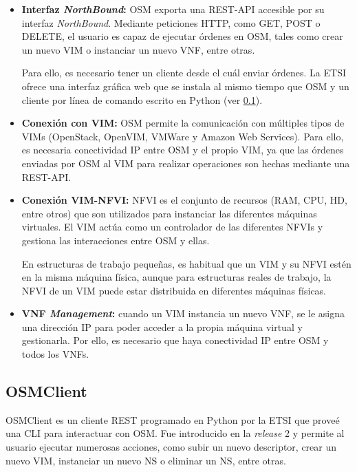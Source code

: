 \begin{itemize}
	\item \textbf{Interfaz \textit{NorthBound}:} \ac{OSM} exporta una \ac{REST}-\ac{API} accesible por su interfaz \textit{NorthBound}. Mediante peticiones \ac{HTTP}, como GET, POST o DELETE, el usuario es capaz de ejecutar órdenes en \ac{OSM}, tales como crear un nuevo \ac{VIM} o instanciar un nuevo \ac{VNF}, entre otras.
	
	Para ello, es necesario tener un cliente desde el cuál enviar órdenes. La \ac{ETSI} ofrece una interfaz gráfica web que se instala al mismo tiempo que \ac{OSM} y un cliente por línea de comando escrito en Python (ver \ref{subsec:osmclientpython}).
	
	\item \textbf{Conexión con \ac{VIM}:} \ac{OSM} permite la comunicación con múltiples tipos de \acp{VIM} (OpenStack, OpenVIM, VMWare y Amazon Web Services). Para ello, es necesaria conectividad \ac{IP} entre \ac{OSM} y el propio \ac{VIM}, ya que las órdenes enviadas por \ac{OSM} al \ac{VIM} para realizar operaciones son hechas mediante una \ac{REST}-\ac{API}.
	
	\item \textbf{Conexión \ac{VIM}-\ac{NFVI}:} \ac{NFVI} es el conjunto de recursos (RAM, CPU, HD, entre otros) que son utilizados para instanciar las diferentes máquinas virtuales. El \ac{VIM} actúa como un controlador de las diferentes \acp{NFVI} y gestiona las interacciones entre \ac{OSM} y ellas.
	
	En estructuras de trabajo pequeñas, es habitual que un \ac{VIM} y su \ac{NFVI} estén en la misma máquina física, aunque para estructuras reales de trabajo, la \ac{NFVI} de un \ac{VIM} puede estar distribuida en diferentes máquinas físicas.
	
	\item \textbf{\ac{VNF} \textit{Management}:} cuando un \ac{VIM} instancia un nuevo \ac{VNF}, se le asigna una dirección \ac{IP} para poder acceder a la propia máquina virtual y gestionarla. Por ello, es necesario que haya conectividad \ac{IP} entre \ac{OSM} y todos los \acp{VNF}. 
\end{itemize}

\subsection{OSMClient}
\label{subsec:osmclientpython}

OSMClient\cite{osmclientbib} es un cliente \ac{REST} programado en Python por la \ac{ETSI} que proveé una \ac{CLI} para interactuar con \ac{OSM}. Fue introducido en la \textit{release} 2 y permite al usuario ejecutar numerosas acciones, como subir un nuevo descriptor, crear un nuevo \ac{VIM}, instanciar un nuevo \ac{NS} o eliminar un \ac{NS}, entre otras. 

